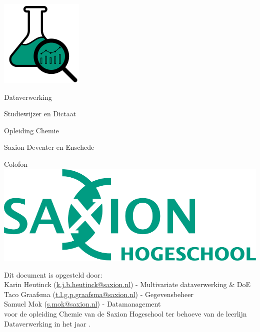 \documentclass[a4paper,12pt,oneside]{book}
\begin{document}
\lstset{language=r}
\lstset{style=mystyle}

\makeatletter
    \begin{titlepage}
	\centering
	\vspace*{1.5in}
	\includegraphics[]{img/logodata.png}\par\vspace{1cm}
	{\huge Dataverwerking \par}
	{\Large Studiewijzer en Dictaat\par}
	\vspace{1.5cm}
	{\large Opleiding Chemie\par}
	{\large Saxion Deventer en Enschede\par}


	\vfill
    \end{titlepage}
\makeatother
\thispagestyle{empty}
\newpage

\begin{center}

{\Large Colofon}\\
\vspace{15mm}
\includegraphics[width=0.7\linewidth]{img/lg_saxion_rgb.png}
\end{center}
\vspace{10mm}
Dit document is opgesteld door:\\
Karin Heutinck (\href{k.j.b.heutinck@saxion.nl}{\textsf{k.j.b.heutinck@saxion.nl}}) - Multivariate dataverwerking \& DoE\\
Taco Graafsma (\href{t.l.g.p.graafsma@saxion.nl}{\textsf{t.l.g.p.graafsma@saxion.nl}}) - Gegevensbeheer \\
Samuel Mok (\href{s.mok@saxion.nl}{\textsf{s.mok@saxion.nl}}) - Datamanagement\\
voor de opleiding Chemie van de Saxion Hogeschool ter behoeve van de leerlijn Dataverwerking in het jaar \the\year.
\end{document}
